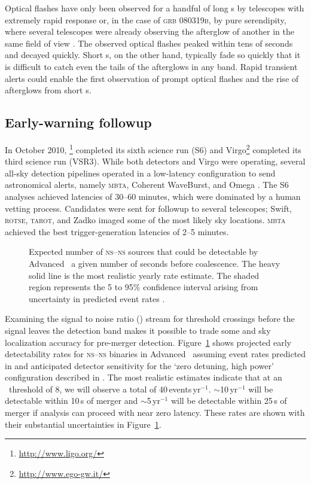 Optical flashes have only been observed for a handful of long \GRB{}s
\citep{2011CRPhy..12..255A} by telescopes with extremely rapid response or, in
the case of \textsc{grb 080319b}, by pure serendipity, where several telescopes
were already observing the afterglow of another \GRB{} in the same field of
view \citep{2008Natur.455..183R}. The observed optical flashes peaked within
tens of seconds and decayed quickly.  Short \GRB{}s, on the other hand,
typically fade so quickly that it is difficult to catch even the tails of the afterglows in any
band. Rapid \GW{} transient alerts could enable the first observation of prompt
optical flashes and the rise of afterglows from short \GRB{}s.

\subsection{Early-warning \EM{} followup}

In October 2010, \LIGO{}\footnote{\url{http://www.ligo.org/}} completed its
sixth science run (S6) and Virgo\footnote{\url{http://www.ego-gw.it/}}
completed its third science run (VSR3).  While both \LIGO{} detectors and Virgo
were operating, several all-sky detection pipelines operated in a low-latency
configuration to send astronomical alerts, namely \textsc{mbta}, Coherent
WaveBurst, and Omega \citep{HugheyGWPAW2011, S6lowlatency}. The S6 analyses
achieved latencies of 30--60 minutes, which were dominated by a human vetting
process. Candidates were sent for \EM{} followup to several telescopes; Swift,
\textsc{rotse}, \textsc{tarot}, and Zadko \citep{kanner2008, HugheyGWPAW2011}
imaged some of the most likely sky locations.  \textsc{mbta} achieved the best
\GW{} trigger-generation latencies of 2--5 minutes.

\begin{figure}[h]
\caption{\label{fig:earlywarning}Expected number of \textsc{ns}--\textsc{ns}
sources that could be detectable by Advanced \LIGO\ a given number of seconds
before coalescence.  The heavy solid line is the most realistic yearly rate
estimate.  The shaded region represents the 5 to 95\% confidence interval
arising from uncertainty in predicted event rates \citep{Abadie:2010p10836}.}
\end{figure}
%
Examining the signal to noise ratio (\SNR{}) stream for threshold crossings
before the \GW{} signal leaves the detection band makes it possible to trade
some \SNR{} and sky localization accuracy for pre-merger detection.
Figure~\ref{fig:earlywarning} shows projected early detectability rates for
\textsc{ns}--\textsc{ns} binaries in Advanced \LIGO\ assuming event rates
predicted in \citet{Abadie:2010p10836} and anticipated detector sensitivity for
the `zero detuning, high power' configuration described in \citet{ALIGONoise}.
The most realistic estimates indicate that at an \SNR\ threshold of 8, we will
observe a total of 40\,events\,yr$^{-1}$. $\sim$10\,yr$^{-1}$ will be detectable
within 10\,s of merger and $\sim$5\,yr$^{-1}$ will be detectable within 25\,s of
merger if analysis can proceed with near zero latency. These rates are shown
with their substantial uncertainties in Figure~\ref{fig:earlywarning}.

